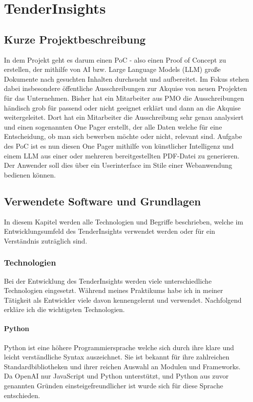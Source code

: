 \chapter{TenderInsights}

\section{Kurze Projektbeschreibung}
In dem Projekt geht es darum einen PoC - also einen Proof of Concept zu erstellen, der mithilfe von AI bzw. Large
Language Models (LLM) große Dokumente nach gesuchten Inhalten durchsucht und aufbereitet. Im Fokus stehen dabei
insbesondere öffentliche Ausschreibungen zur Akquise von neuen Projekten für das Unternehmen. Bisher hat ein Mitarbeiter
aus PMO die Ausschreibungen händisch grob für passend oder nicht geeignet erklärt und dann an die Akquise
weitergeleitet. Dort hat ein Mitarbeiter die Ausschreibung sehr genau analysiert und einen sogenannten One Pager
erstellt, der alle Daten welche für eine Entscheidung, ob man sich bewerben möchte oder nicht, relevant sind. Aufgabe
des PoC ist es nun diesen One Pager mithilfe von künstlicher Intelligenz und einem LLM aus einer oder mehreren
bereitgestellten PDF-Datei zu generieren. Der Anwender soll dies über ein Userinterface im Stile einer Webanwendung
bedienen können.

\section{Verwendete Software und Grundlagen}
In diesem Kapitel werden alle Technologien und Begriffe beschrieben, welche im Entwicklungsumfeld des TenderInsights
verwendet werden oder für ein Verständnis zuträglich sind.

\subsection{Technologien}
Bei der Entwicklung des TenderInsights werden viele unterschiedliche Technologien eingesetzt. Während meines Praktikums
habe ich in meiner Tätigkeit als Entwickler viele davon kennengelernt und verwendet. Nachfolgend erkläre ich die
wichtigsten Technologien.

\subsubsection{Python}
Python ist eine höhere Programmiersprache welche sich durch ihre klare und leicht verständliche Syntax auszeichnet. Sie
ist bekannt für ihre zahlreichen Standardbibliotheken und ihrer reichen Auswahl an Modulen und Frameworks. Da OpenAI nur
JavaScript und Python unterstützt, und Python aus zuvor genannten Gründen einsteigefreundlicher ist wurde sich für diese
Sprache entschieden.

